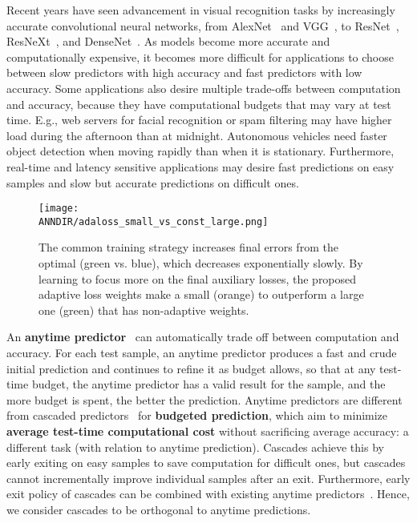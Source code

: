 Recent years have seen advancement in visual recognition tasks
by increasingly accurate convolutional neural networks, from AlexNet~\cite{alexnet} and VGG~\cite{vgg}, to ResNet~\cite{resnet}, ResNeXt~\cite{resnext}, and DenseNet~\cite{densenet}. 
As models become more accurate and computationally expensive, it becomes more difficult for applications to choose between slow predictors with high accuracy and fast predictors with low accuracy. 
Some applications also desire multiple trade-offs between computation and accuracy, because they have computational budgets that may vary at test time. E.g., web servers for facial recognition or spam filtering may have higher load during the afternoon than at midnight.  Autonomous vehicles need faster object detection when moving rapidly than when it is stationary.  Furthermore, real-time and latency sensitive applications may desire fast predictions on easy samples and slow but accurate predictions on difficult ones. 
\begin{figure}
    \centering
    \texttt{[image: \\ANNDIR/adaloss\_small\_vs\_const\_large.png]}
    \caption{The common \ann training strategy increases final errors from the optimal (green vs. blue), which decreases exponentially slowly. By learning to focus more on the final auxiliary losses, the proposed adaptive loss weights make a small \ann (orange) to outperform a large one (green) that has non-adaptive weights. }
    \label{fig:sieve_small_vs_const_large}
\end{figure}

An \textbf{anytime predictor}~\cite{horvitz:1987,boddydean,anytime,speedboost,msdense} can automatically trade off between computation and accuracy. For each test sample, an anytime predictor produces a fast and crude initial prediction and continues to refine it as budget allows, so that at any test-time budget, the anytime predictor has a valid result for the sample, and the more budget is spent, the better the prediction. 
Anytime predictors are different from cascaded predictors~\cite{cascade,xu:14,cai:15,adaptivenn,cascade_nn} for \textbf{budgeted prediction}, which aim to minimize \textbf{average test-time computational cost} without sacrificing average accuracy: a different task (with relation to anytime prediction). Cascades achieve this by early exiting on easy samples to save computation for difficult ones, but cascades cannot incrementally improve individual samples after an exit. Furthermore, early exit policy of cascades can be combined with existing anytime predictors~\cite{adaptivenn,cascade_nn}. Hence, we consider cascades to be orthogonal to anytime predictions.




